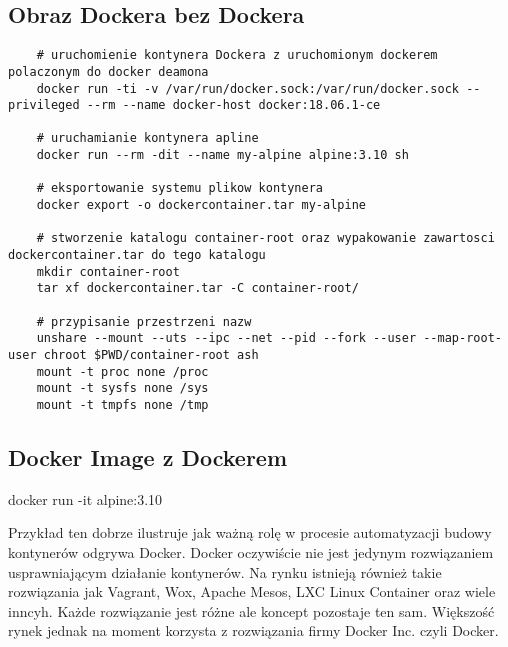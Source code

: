 \subsection{Obraz Dockera bez Dockera}
\begin{lstlisting}
    # uruchomienie kontynera Dockera z uruchomionym dockerem polaczonym do docker deamona
    docker run -ti -v /var/run/docker.sock:/var/run/docker.sock --privileged --rm --name docker-host docker:18.06.1-ce

    # uruchamianie kontynera apline 
    docker run --rm -dit --name my-alpine alpine:3.10 sh

    # eksportowanie systemu plikow kontynera
    docker export -o dockercontainer.tar my-alpine

    # stworzenie katalogu container-root oraz wypakowanie zawartosci dockercontainer.tar do tego katalogu
    mkdir container-root
    tar xf dockercontainer.tar -C container-root/

    # przypisanie przestrzeni nazw
    unshare --mount --uts --ipc --net --pid --fork --user --map-root-user chroot $PWD/container-root ash 
    mount -t proc none /proc
    mount -t sysfs none /sys
    mount -t tmpfs none /tmp

\end{lstlisting}

\subsection{Docker Image z Dockerem}
docker run -it alpine:3.10

Przykład ten dobrze ilustruje jak ważną rolę w procesie automatyzacji budowy kontynerów odgrywa Docker.
Docker oczywiście nie jest jedynym rozwiązaniem usprawniającym działanie kontynerów. Na rynku istnieją również takie rozwiązania jak Vagrant, Wox, Apache Mesos, LXC Linux Container oraz wiele inncyh. Każde rozwiązanie jest różne ale koncept pozostaje ten sam. Większość rynek jednak na moment korzysta z rozwiązania firmy Docker Inc. czyli Docker.


